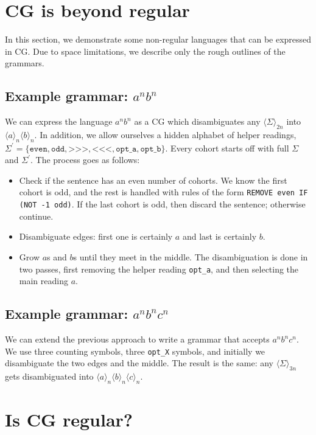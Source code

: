 \documentclass[11pt]{article}
\def\t#1{\texttt{#1}}
\def\maxAmb#1{$\langle \Sigma \rangle_#1$}
\def\maxAmbCFG#1{$\langle \Sigma,\Sigma^{\prime} \rangle_#1$}
\begin{document}
\section{CG is beyond regular}

In this section, we demonstrate some non-regular languages that can be expressed in CG.
Due to space limitations, we describe only the rough outlines of the grammars.

\subsection{Example grammar: $a^nb^n$ }

We can express the language $a^nb^n$ as a CG which disambiguates
any \maxAmb{{2n}} into $\langle a \rangle_n \langle b \rangle_n$.
In addition, we allow ourselves a hidden alphabet of helper readings, 
$\Sigma^{\prime} = \{\t{even}, \t{odd}, \t{>>>}, \t{<<<}, \t{opt\_a}, \t{opt\_b}\}$. 
Every cohort starts off with full $\Sigma$ and $\Sigma^{\prime}$.
The process goes as follows:
\begin{itemize}
\item Check if the sentence has an even number of cohorts. We know the first cohort
      is odd, and the rest is handled with rules of the form \t{REMOVE even IF (NOT -1 odd)}.
      If the last cohort is odd, then discard the sentence; otherwise continue.
\item Disambiguate edges: first one is certainly $a$ and last is certainly $b$.
\item Grow $a$s and $b$s until they meet in the middle. The disambiguation is done in two 
      passes, first removing the helper reading \t{opt\_a}, and then selecting the main reading $a$.
\end{itemize}

\subsection{Example grammar: $a^nb^nc^n$}

We can extend the previous approach to write a grammar that accepts $a^nb^nc^n$.
We use three counting symbols, three \t{opt\_X} symbols, and initially we disambiguate
the two edges and the middle. The result is the same: any \maxAmb{{3n}} gets disambiguated
into $\langle a \rangle_n \langle b \rangle_n \langle c \rangle_n$.


\section{Is CG regular?}
\end{document}
